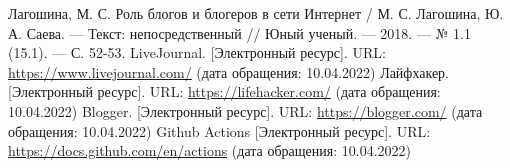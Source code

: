 


\renewcommand\bibname{Список использованных источников}

\begin{thebibliography}{3}
	 Лагошина, М. С. Роль блогов и блогеров в сети Интернет / М. С. Лагошина, Ю. А. Саева. — Текст: непосредственный // Юный ученый. — 2018. — № 1.1 (15.1). — С. 52-53.
	 LiveJournal. [Электронный ресурс]. URL: \url{https://www.livejournal.com/} (дата обращения: 10.04.2022)
	 Лайфхакер. [Электронный ресурс]. URL: \url{https://lifehacker.com/} (дата обращения: 10.04.2022)
	 Blogger. [Электронный ресурс]. URL: \url{https://blogger.com/} (дата обращения: 10.04.2022)
	 Github Actions [Электронный ресурс]. URL:
	\url{https://docs.github.com/en/actions} (дата обращения: 10.04.2022)
\end{thebibliography}
